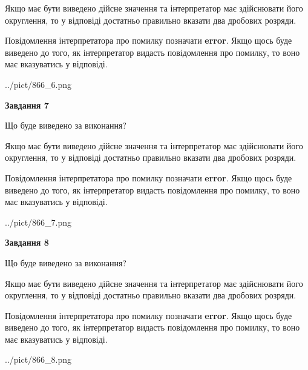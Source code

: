 \documentclass[12pt, ukrainian]{article}
\begin{document}
{\begin {Large}
Якщо має бути виведено дійсне значення та інтерпретатор має здійснювати його округлення, 
то у відповіді достатньо правильно вказати два дробових розряди.

Повідомлення інтерпретатора про помилку позначати \textbf{error}.
Якщо щось буде виведено до того, як інтерпретатор видасть повідомлення про помилку, 
то воно має вказуватись у відповіді. \par

\begin{center}
	{../pict/866_6.png}
\end{center}
\newpage

{\begin {center}\textbf{Завдання 7}\end {center}}\par
Що буде виведено за виконання? \par

Якщо має бути виведено дійсне значення та інтерпретатор має здійснювати його округлення, 
то у відповіді достатньо правильно вказати два дробових розряди.

Повідомлення інтерпретатора про помилку позначати \textbf{error}.
Якщо щось буде виведено до того, як інтерпретатор видасть повідомлення про помилку, 
то воно має вказуватись у відповіді. \par

\begin{center}
	{../pict/866_7.png}
\end{center}
\newpage

{\begin {center}\textbf{Завдання 8}\end {center}}\par
Що буде виведено за виконання? \par

Якщо має бути виведено дійсне значення та інтерпретатор має здійснювати його округлення, 
то у відповіді достатньо правильно вказати два дробових розряди.

Повідомлення інтерпретатора про помилку позначати \textbf{error}.
Якщо щось буде виведено до того, як інтерпретатор видасть повідомлення про помилку, 
то воно має вказуватись у відповіді. \par

\begin{center}
	{../pict/866_8.png}
\end{center}
\newpage


\end{Large}}
\end{document}
